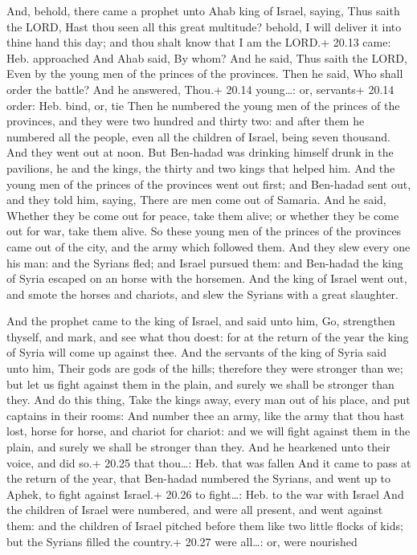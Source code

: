  And, behold, there came a prophet unto Ahab king of
Israel, saying, Thus saith the LORD, Hast thou seen all this great
multitude? behold, I will deliver it into thine hand this day; and thou
shalt know that I am the LORD.+ 20.13 came: Heb. approached
 And Ahab said, By whom? And he said, Thus saith the LORD,
Even by the young men of the princes of the provinces. Then he said, Who
shall order the battle? And he answered, Thou.+ 20.14 young\ldots: or,
servants+ 20.14 order: Heb. bind, or, tie  Then he numbered
the young men of the princes of the provinces, and they were two hundred
and thirty two: and after them he numbered all the people, even all the
children of Israel, being seven thousand.  And they went
out at noon. But Ben-hadad was drinking himself drunk in the pavilions,
he and the kings, the thirty and two kings that helped him.
 And the young men of the princes of the provinces went out
first; and Ben-hadad sent out, and they told him, saying, There are men
come out of Samaria.  And he said, Whether they be come out
for peace, take them alive; or whether they be come out for war, take
them alive.  So these young men of the princes of the
provinces came out of the city, and the army which followed them.
 And they slew every one his man: and the Syrians fled; and
Israel pursued them: and Ben-hadad the king of Syria escaped on an horse
with the horsemen.  And the king of Israel went out, and
smote the horses and chariots, and slew the Syrians with a great
slaughter.

 And the prophet came to the king of Israel, and said
unto him, Go, strengthen thyself, and mark, and see what thou doest: for
at the return of the year the king of Syria will come up against thee.
 And the servants of the king of Syria said unto him, Their
gods are gods of the hills; therefore they were stronger than we; but
let us fight against them in the plain, and surely we shall be stronger
than they.  And do this thing, Take the kings away, every
man out of his place, and put captains in their rooms:  And
number thee an army, like the army that thou hast lost, horse for horse,
and chariot for chariot: and we will fight against them in the plain,
and surely we shall be stronger than they. And he hearkened unto their
voice, and did so.+ 20.25 that thou\ldots: Heb. that was fallen
 And it came to pass at the return of the year, that
Ben-hadad numbered the Syrians, and went up to Aphek, to fight against
Israel.+ 20.26 to fight\ldots: Heb. to the war with Israel 
And the children of Israel were numbered, and were all present, and went
against them: and the children of Israel pitched before them like two
little flocks of kids; but the Syrians filled the country.+ 20.27 were
all\ldots: or, were nourished

